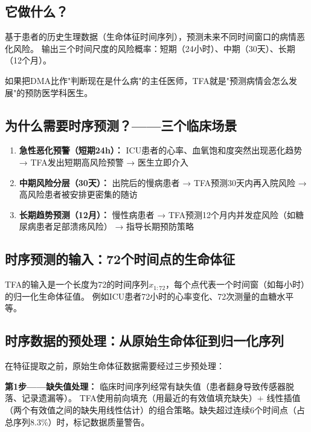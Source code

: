 \documentclass[11pt,a4paper]{ctexart}
\begin{document}
\subsection{它做什么？}

\begin{defbox}[TFA的核心任务]
基于患者的历史生理数据（生命体征时间序列），预测未来不同时间窗口的病情恶化风险。
输出三个时间尺度的风险概率：短期（24小时）、中期（30天）、长期（12个月）。
\end{defbox}

如果把DMA比作"判断现在是什么病"的主任医师，TFA就是"预测病情会怎么发展"的预防医学科医生。

\subsection{为什么需要时序预测？——三个临床场景}

\begin{enumerate}[nosep]
\item \textbf{急性恶化预警（短期24h）：} ICU患者的心率、血氧饱和度突然出现恶化趋势 → TFA发出短期高风险预警 → 医生立即介入
\item \textbf{中期风险分层（30天）：} 出院后的慢病患者 → TFA预测30天内再入院风险 → 高风险患者被安排更密集的随访
\item \textbf{长期趋势预测（12月）：} 慢性病患者 → TFA预测12个月内并发症风险（如糖尿病患者足部溃疡风险） → 指导长期预防策略
\end{enumerate}

\subsection{时序预测的输入：72个时间点的生命体征}

TFA的输入是一个长度为72的时间序列$x_{1:72}$，每个点代表一个时间窗（如每小时）的归一化生命体征值。
例如ICU患者72小时的心率变化、72次测量的血糖水平等。


\subsection{时序数据的预处理：从原始生命体征到归一化序列}

在特征提取之前，原始生命体征数据需要经过三步预处理：

\textbf{第1步——缺失值处理：}
临床时间序列经常有缺失值（患者翻身导致传感器脱落、记录遗漏等）。
TFA使用前向填充（用最近的有效值填充缺失）+ 线性插值（两个有效值之间的缺失用线性估计）的组合策略。缺失超过连续6个时间点（占总序列8.3\%）时，标记数据质量警告。
\end{document}
